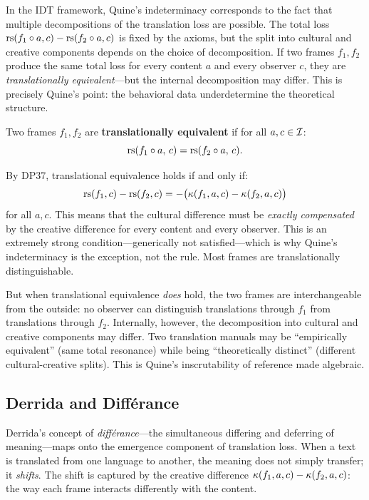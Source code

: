 In the IDT framework, Quine's indeterminacy corresponds to the fact that
multiple decompositions of the translation loss are possible.  The total
loss $\mathrm{rs}(f_1 \circ a, c) - \mathrm{rs}(f_2 \circ a, c)$ is fixed by the
axioms, but the split into cultural and creative components depends on the
choice of decomposition.  If two frames $f_1, f_2$ produce the same total
loss for every content $a$ and every observer $c$, they are
\emph{translationally equivalent}---but the internal decomposition may
differ.  This is precisely Quine's point: the behavioral data underdetermine
the theoretical structure.

\begin{definition}
\label{def:translational-equivalence}
Two frames $f_1, f_2$ are \textbf{translationally equivalent} if for all
$a, c \in \mathcal{I}$:
\[
\mathrm{rs}(f_1 \circ a,\, c) = \mathrm{rs}(f_2 \circ a,\, c).
\]
\end{definition}

By DP37, translational equivalence holds if and only if:
\[
\mathrm{rs}(f_1, c) - \mathrm{rs}(f_2, c) = -\bigl(\kappa(f_1, a, c) - \kappa(f_2, a, c)\bigr)
\]
for all $a, c$.  This means that the cultural difference must be \emph{exactly
compensated} by the creative difference for every content and every observer.
This is an extremely strong condition---generically not satisfied---which is why
Quine's indeterminacy is the exception, not the rule.  Most frames are
translationally distinguishable.

But when translational equivalence \emph{does} hold, the two frames are
interchangeable from the outside: no observer can distinguish translations
through $f_1$ from translations through $f_2$.  Internally, however, the
decomposition into cultural and creative components may differ.  Two translation
manuals may be ``empirically equivalent'' (same total resonance) while being
``theoretically distinct'' (different cultural-creative splits).  This is
Quine's inscrutability of reference made algebraic.

\subsection{Derrida and Diff\'erance}

Derrida's concept of \textit{diff\'erance}---the simultaneous differing and
deferring of meaning---maps onto the emergence component of translation loss.
When a text is translated from one language to another, the meaning does not
simply transfer; it \emph{shifts}.  The shift is captured by the creative
difference $\kappa(f_1, a, c) - \kappa(f_2, a, c)$: the way each frame
interacts differently with the content.


